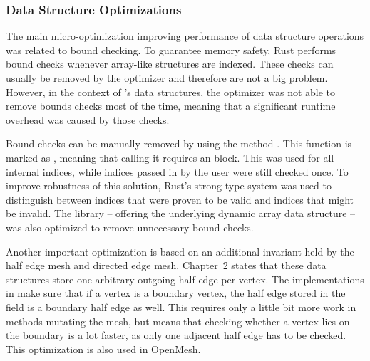 \subsubsection*{Data Structure Optimizations}

The main micro-optimization improving performance of data structure operations was related to bound checking.
To guarantee memory safety, Rust performs bound checks whenever array-like structures are indexed.
These checks can usually be removed by the optimizer and therefore are not a big problem.
However, in the context of 's data structures, the optimizer was not able to remove bounds checks most of the time, meaning that a significant runtime overhead was caused by those checks.

Bound checks can be manually removed by using the method .
This function is marked as , meaning that calling it requires an  block.
This was used for all internal indices, while indices passed in by the user were still checked once.
To improve robustness of this solution, Rust's strong type system was used to distinguish between indices that were proven to be valid and indices that might be invalid.
The library  -- offering the underlying dynamic array data structure -- was also optimized to remove unnecessary bound checks.

Another important optimization is based on an additional invariant held by the half edge mesh and directed edge mesh.
Chapter~2 states that these data structures store one arbitrary outgoing half edge per vertex.
The implementations in  make sure that if a vertex is a boundary vertex, the half edge stored in the  field is a boundary half edge as well.
This requires only a little bit more work in methods mutating the mesh, but means that checking whether a vertex lies on the boundary is a lot faster, as only one adjacent half edge has to be checked.
This optimization is also used in OpenMesh.

